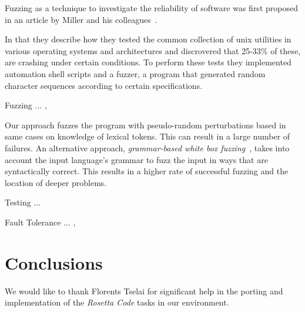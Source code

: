 \documentclass[10pt]{sigplanconf}
\begin{document}
Fuzzing as a technique to investigate the reliability of software
was first proposed in an article by Miller and his colleagues~\cite{MFS90}.

In that they describe how they tested the common collection of {\sc unix}
utilities in various operating systems and architectures and discrovered that
25-33\% of these, are crashing under certain conditions. To perform these tests
they implemented automation shell scripts and a fuzzer, a program that generated
random character sequences according to certain specifications.

Fuzzing ... \cite{TJC08}, \cite{WWGZ11}

Our approach fuzzes the program with pseudo-random
perturbations based in same cases on knowledge of
lexical tokens.
This can result in a large number of failures.
An alternative approach, {\em grammar-based white box fuzzing}~\cite{God08},
takes into account the input language's grammar to fuzz the input in
ways that are syntactically correct.
This results in a higher rate of successful fuzzing and the location
of deeper problems.

Testing ... \cite{HAM06}

Fault Tolerance ... \cite{KOKR07}, \cite{LYU95}

\section{Conclusions} %
\label{sec:conclusions}


\acks

We would like to thank Florents Tselai for significant
help in the porting and implementation of the
{\em Rosetta Code} tasks in our environment.









\end{document}
